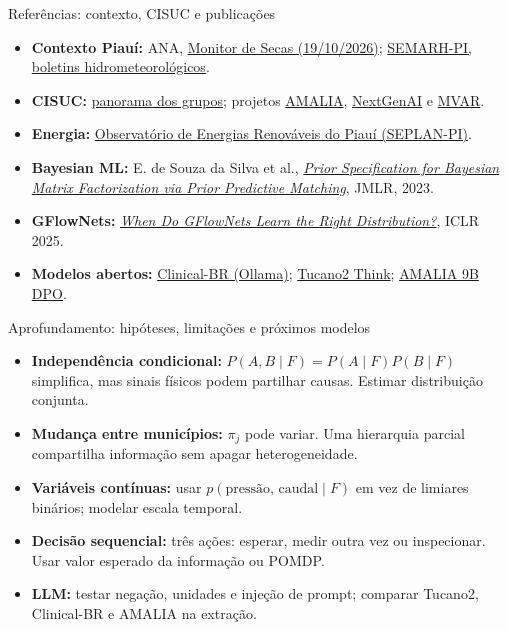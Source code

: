 \documentclass[aspectratio=169,11pt]{beamer}
\begin{document}
\appendix
\begin{frame}{Referências: contexto, CISUC e publicações}
\footnotesize
\begin{itemize}\setlength\itemsep{10pt}
\item \textbf{Contexto Piauí:} ANA, \href{https://www.gov.br/ana/pt-br/assuntos/noticias-e-eventos/noticias-periodo-eleitoral-2026/seca-se-intensifica-no-nordeste-e-norte-fenomeno-se-abranda-no-centro-oeste-e-sudeste-e-nao-e-registrado-no-sul-segundo-monitor-de-secas}{Monitor de Secas (19/10/2026)}; \href{https://www.semarh.pi.gov.br/meteorologia/boletins}{SEMARH-PI, boletins hidrometeorológicos}.
\item \textbf{CISUC:} \href{https://www.cisuc.uc.pt/en/overview}{panorama dos grupos}; projetos \href{https://www.cisuc.uc.pt/en/projects/criacao-do-modelo-de-linguagem-amalia}{AMALIA}, \href{https://www.cisuc.uc.pt/en/projects/NextGenAI-CentreForResponsibleAI}{NextGenAI} e \href{https://www.cisuc.uc.pt/en/projects/mvar}{MVAR}.
\item \textbf{Energia:} \href{https://dados.seplan.pi.gov.br/observatorio/energias-renovaveis/}{Observatório de Energias Renováveis do Piauí (SEPLAN-PI)}.
\item \textbf{Bayesian ML:} E. de Souza da Silva et al., \href{https://jmlr.org/papers/v24/21-0623.html}{\emph{Prior Specification for Bayesian Matrix Factorization via Prior Predictive Matching}}, JMLR, 2023.
\item \textbf{GFlowNets:} \href{https://proceedings.iclr.cc/paper_files/paper/2025/hash/a48f8928f78a58399ef0049453c14b02-Abstract-Conference.html}{\emph{When Do GFlowNets Learn the Right Distribution?}}, ICLR 2025.
\item \textbf{Modelos abertos:} \href{https://ollama.com/cabelo/clinical-br-llama-2-7b}{Clinical-BR (Ollama)}; \href{https://huggingface.co/Polygl0t/Tucano2-qwen-0.5B-Think}{Tucano2 Think}; \href{https://huggingface.co/amalia-llm/AMALIA-9B-0626-DPO}{AMALIA 9B DPO}.
\end{itemize}
\end{frame}

\begin{frame}{Aprofundamento: hipóteses, limitações e próximos modelos}
\small
\begin{itemize}\setlength\itemsep{8pt}
\item \textbf{Independência condicional:} $P(A,B\mid F)=P(A\mid F)P(B\mid F)$ simplifica, mas sinais físicos podem partilhar causas. \alert{Estimar distribuição conjunta.}
\item \textbf{Mudança entre municípios:} $\pi_j$ pode variar. Uma hierarquia parcial compartilha informação sem apagar heterogeneidade.
\item \textbf{Variáveis contínuas:} usar $p(\text{pressão, caudal}\mid F)$ em vez de limiares binários; modelar escala temporal.
\item \textbf{Decisão sequencial:} três ações: esperar, medir outra vez ou inspecionar. Usar valor esperado da informação ou POMDP.
\item \textbf{LLM:} testar negação, unidades e injeção de prompt; comparar Tucano2, Clinical-BR e AMALIA na extração.
\end{itemize}
\end{frame}
\end{document}
